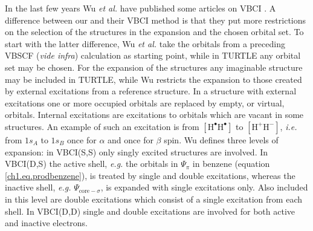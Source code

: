 In the last few years Wu \textit{et al.} have published some articles on VBCI \cite{vbci_wu1,vbci_wu2}. A difference between our and their VBCI method is that they put more restrictions on the selection of the structures in the expansion and the chosen orbital set. To start with the latter difference, Wu \textit{et al.} take the orbitals from a preceding VBSCF (\textit{vide infra}) calculation as starting point, while in TURTLE any orbital set may be chosen. For the expansion of the structures any imaginable structure may be included in TURTLE, while Wu restricts the expansion to those created by external excitations from a reference structure. In a structure with external excitations one or more occupied orbitals are replaced by empty, or virtual, orbitals. Internal excitations are excitations to orbitals which are vacant in some structures. An example of such an excitation is from $\mathrm{[H^\bullet H^\bullet]}$ to $\mathrm{[H^{+} H^{-}]}$, \textit{i.e.} from $1s_A$ to $1s_B$ once for $\alpha$ and once for $\beta$ spin. Wu defines three levels of expansion: in VBCI(S,S) only singly excited structures are involved. In VBCI(D,S) the active shell, \textit{e.g.} the orbitals in $\Psi_{\pi}$ in benzene (equation \ref{ch1.eq.prodbenzene}), is treated by single and double excitations, whereas the inactive shell, \textit{e.g.} $\Psi_{\mathrm{core}-\sigma}$, is expanded with single excitations only. Also included in this level are double excitations which consist of a single excitation from each shell. In VBCI(D,D) single and double excitations are involved for both active and inactive electrons.

